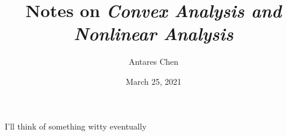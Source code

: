 \documentclass{article}
\title{Notes on \emph{Convex Analysis and Nonlinear Analysis}}
\author{Antares Chen}
\date{March 25, 2021}
\begin{document}
\maketitle

\begin{center}
I'll think of something witty eventually
\end{center}






\end{document}
